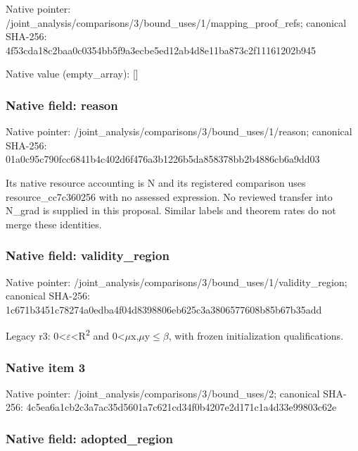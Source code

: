 \documentclass[10pt,a4paper]{article}
\begin{document}
Native pointer: /joint\_analysis/comparis\allowbreak{}ons/3/bound\_uses/1/mappi\allowbreak{}ng\_proof\_refs; canonical SHA-256: 4f53cda18c2baa0c0354bb5f\allowbreak{}9a3ecbe5ed12ab4d8e11ba87\allowbreak{}3c2f11161202b945



Native value (empty\_array): []



\subsubsection{Native field: reason}


Native pointer: /joint\_analysis/comparis\allowbreak{}ons/3/bound\_uses/1/reaso\allowbreak{}n; canonical SHA-256: 01a0c95c790fcc6841b4c402\allowbreak{}d6f476a3b1226b5da858378b\allowbreak{}b2b4886cb6a9dd03


Its native resource accounting is N and its registered comparison uses resource\_cc7c360256 with no assessed expression. No reviewed transfer into N\_grad is supplied in this proposal. Similar labels and theorem rates do not merge these identities.


\subsubsection{Native field: validity\_region}


Native pointer: /joint\_analysis/comparis\allowbreak{}ons/3/bound\_uses/1/valid\allowbreak{}ity\_region; canonical SHA-256: 1c671b3451c78274a0edba4f\allowbreak{}04d8398806eb625c3a380657\allowbreak{}7608b85b67b35add


Legacy r3: 0<\ensuremath{\varepsilon}<R\textsuperscript{2} and 0<\ensuremath{\mu}x,\ensuremath{\mu}y\ensuremath{\le}\ensuremath{\beta}, with frozen initialization qualifications.


\subsubsection{Native item 3}


Native pointer: /joint\_analysis/comparis\allowbreak{}ons/3/bound\_uses/2; canonical SHA-256: 4c5ea6a1cb2c3a7ac35d5601\allowbreak{}a7c621cd34f0b4207e2d171c\allowbreak{}1a4d33e99803c62e



\subsubsection{Native field: adopted\_region}
\end{document}
